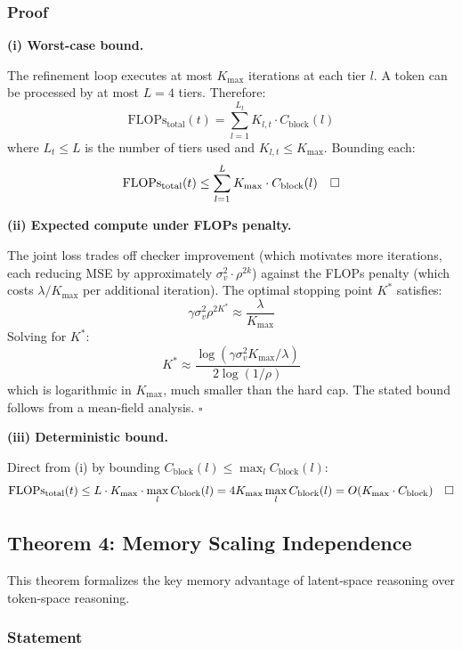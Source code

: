 \documentclass[11pt,a4paper]{article}
\theoremstyle{definition}
\begin{document}
\subsubsection{Proof}

\noindent\textbf{(i) Worst-case bound.}

\noindent The refinement loop executes at most $K_{\max}$ iterations at each tier $l$. A token can be processed by at most $L = 4$ tiers. Therefore:
\[ \mathrm{FLOPs}_{\mathrm{total}}(t) = \sum_{l=1}^{L_t} K_{l,t} \cdot C_{\mathrm{block}}(l) \]
where $L_t \leq L$ is the number of tiers used and $K_{l,t} \leq K_{\max}$. Bounding each:
\[ \mathrm{FLOPs}_{\mathrm{total}}(t) \leq \sum_{l=1}^{L} K_{\max} \cdot C_{\mathrm{block}}(l) \quad \hfill\square \]

\vspace{0.5em}
\noindent\textbf{(ii) Expected compute under FLOPs penalty.}

\noindent The joint loss trades off checker improvement (which motivates more iterations, each reducing MSE by approximately $\sigma_v^2 \cdot \rho^{2k}$) against the FLOPs penalty (which costs $\lambda / K_{\max}$ per additional iteration). The optimal stopping point $K^*$ satisfies:
\[ \gamma \sigma_v^2 \rho^{2K^*} \approx \frac{\lambda}{K_{\max}} \]
Solving for $K^*$:
\[ K^* \approx \frac{\log(\gamma \sigma_v^2 K_{\max} / \lambda)}{2 \log(1/\rho)} \]
which is logarithmic in $K_{\max}$, much smaller than the hard cap. The stated bound follows from a mean-field analysis. \hfill$\square$

\vspace{0.5em}
\noindent\textbf{(iii) Deterministic bound.}

\noindent Direct from (i) by bounding $C_{\mathrm{block}}(l) \leq \max_l C_{\mathrm{block}}(l)$:
\[ \mathrm{FLOPs}_{\mathrm{total}}(t) \leq L \cdot K_{\max} \cdot \max_l C_{\mathrm{block}}(l) = 4 K_{\max} \max_l C_{\mathrm{block}}(l) = O(K_{\max} \cdot C_{\mathrm{block}}) \quad \hfill\square \]

\subsection{Theorem 4: Memory Scaling Independence}

This theorem formalizes the key memory advantage of latent-space reasoning over token-space reasoning.

\subsubsection{Statement}
\end{document}
